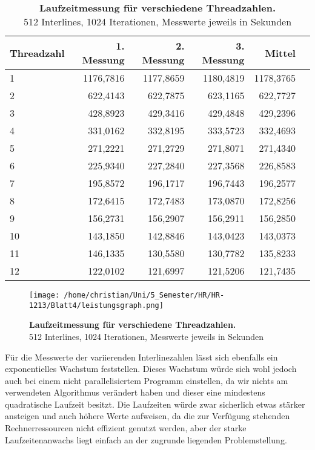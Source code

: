 \documentclass[a4paper,12pt]{scrartcl}
\begin{document}
\begin{table}[!h]
\begin{tabular}{|l|r|r|r|r|r|}
\hline
Threadzahl&1. Messung&2. Messung&3. Messung&Mittel\\
\hline
1	&1176,7816	&1177,8659	&1180,4819	&1178,3765\\
\hline
2	&622,4143	&622,7875	&623,1165	&622,7727\\
\hline
3	&428,8923	&429,3416	&429,4848	&429,2396\\
\hline
4	&331,0162	&332,8195	&333,5723	&332,4693\\
\hline
5	&271,2221	&271,2729	&271,8071	&271,4340\\
\hline
6	&225,9340	&227,2840	&227,3568	&226,8583\\
\hline
7	&195,8572	&196,1717	&196,7443	&196,2577\\
\hline
8	&172,6415	&172,7483	&173,0870	&172,8256\\
\hline
9	&156,2731	&156,2907	&156,2911	&156,2850\\
\hline
10	&143,1850	&142,8846	&143,0423	&143,0373\\
\hline
11	&146,1335	&130,5580	&130,7782	&135,8233\\
\hline
12	&122,0102	&121,6997	&121,5206	&121,7435\\

\hline
\end{tabular}
\caption{\textbf{Laufzeitmessung für verschiedene Threadzahlen.} \\512 Interlines, 1024 Iterationen, Messwerte jeweils in Sekunden}
\end{table}
\begin{figure}[!h]
\texttt{[image: /home/christian/Uni/5\_Semester/HR/HR-1213/Blatt4/leistungsgraph.png]}
\caption{\textbf{Laufzeitmessung für verschiedene Threadzahlen.} \\512 Interlines, 1024 Iterationen, Messwerte jeweils in Sekunden}
\end{figure}

Für die Messwerte der variierenden Interlinezahlen lässt sich ebenfalls ein exponentielles Wachstum feststellen. Dieses Wachstum würde sich wohl jedoch auch bei einem nicht parallelisiertem Programm einstellen, da wir nichts am verwendeten Algorithmus verändert haben und dieser eine mindestens quadratische Laufzeit besitzt. Die Laufzeiten würde zwar sicherlich etwas stärker ansteigen und auch höhere Werte aufweisen, da die zur Verfügung stehenden Rechnerressourcen nicht effizient genutzt werden, aber der starke Laufzeitenanwachs liegt einfach an der zugrunde liegenden Problemstellung. 
\end{document}
